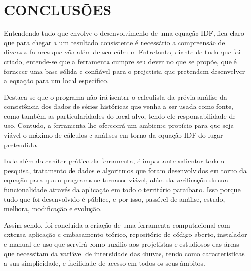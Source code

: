 \chapter{CONCLUSÕES}

Entendendo tudo que envolve o desenvolvimento de uma equação IDF, fica claro que para chegar a um resultado consistente é necessário a compreensão de diversos fatores que vão além de seu cálculo. Entretanto, diante de tudo que foi criado, entende-se que a ferramenta cumpre seu dever no que se propõe, que é fornecer uma base sólida e confiável para o projetista que pretendem desenvolver a equação para um local específico. 

Destaca-se que o programa não irá isentar o calculista da prévia análise da consistência dos dados de séries históricas que venha a ser usada como fonte, como também as particularidades do local alvo, tendo ele responsabilidade de uso. Contudo, a ferramenta lhe oferecerá um ambiente propício para que seja viável o máximo de cálculos e análises em torno da equação IDF do lugar pretendido.

Indo além do caráter prático da ferramenta, é importante salientar toda a pesquisa, tratamento de dados e algoritmos que foram desenvolvidos em torno da equação para que o programa se tornasse viável, além da verificação de sua funcionalidade através da aplicação em todo o território paraibano. Isso porque tudo que foi desenvolvido é público, e por isso, passível de análise, estudo, melhora, modificação e evolução.

Assim sendo, foi concluída a criação de uma ferramenta computacional com extensa aplicação e embasamento teórico, repositório de código aberto, instalador e manual de uso que servirá como auxilio aos projetistas e estudiosos das áreas que necessitam da variável de intensidade das chuvas, tendo como características a sua simplicidade, e facilidade de acesso em todos os seus âmbitos.